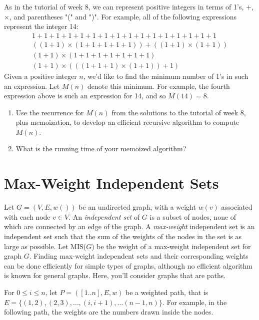 \documentclass[11pt]{article}
\def\question#1{\red{#1}}
\def\red#1{{\color{red}#1}}
\begin{document}
As in the tutorial of week 8, we can represent positive integers in
terms of 1's, $+$, $\times$, and parentheses "(" and ")".  For
example, all of the following expressions represent the integer 14:
\[
\begin{array}{l}
1 + 1 + 1 + 1 + 1 + 1 + 1 + 1 + 1 + 1 + 1 + 1 + 1 + 1 + 1 + 1 \\
((1 + 1) \times (1 + 1 + 1 + 1 + 1)) + ((1 + 1) \times (1 + 1)) \\
(1 + 1) \times (1 + 1 + 1 + 1 + 1 + 1 + 1) \\
(1 + 1) \times (((1 + 1 + 1) \times (1 + 1)) + 1) 
\end{array}
\]
Given a positive integer $n$, we'd like to find the minimum number of
1's in such an expression.  Let $M(n)$ denote this minimum.  For
example, the fourth expression above is such an expression for 14, and
so $M(14) = 8$.

\begin{enumerate}
\item \question{Use the recurrence for $M(n)$ from the solutions to the tutorial of week 8, plus memoization, to develop an efficient recursive algorithm to compute $M(n)$.}

\item \question{What is the running time of your memoized algorithm?}
\end{enumerate}

\section{Max-Weight Independent Sets}
\label{sec-4}
Let $G=(V,E,w())$ be an undirected graph, with a weight $w(v)$
associated with each node $v\in V$.  An \emph{independent set} of $G$ is a
subset of nodes, none of which are connected by an edge of the
graph. A \emph{max-weight} independent set is an
independent set such that the sum of the weights of the nodes in the
set is as large as possible. 
Let MIS($G$) be the weight of a max-weight independent set for graph $G$.
Finding max-weight independent sets and their corresponding weights
can be done efficiently for simple types of graphs, although no efficient
algorithm is known for general graphs. Here, you'll consider graphs
that are paths.

For $0 \le i \le n$, let $P = ([1..n],E,w)$ be a weighted path, that is $E = \{(1,2),
(2,3), \ldots, (i,i+1), \ldots (n-1,n)\}$.  
For example, in the following path, the weights are the numbers drawn
inside the nodes.  
\end{document}
